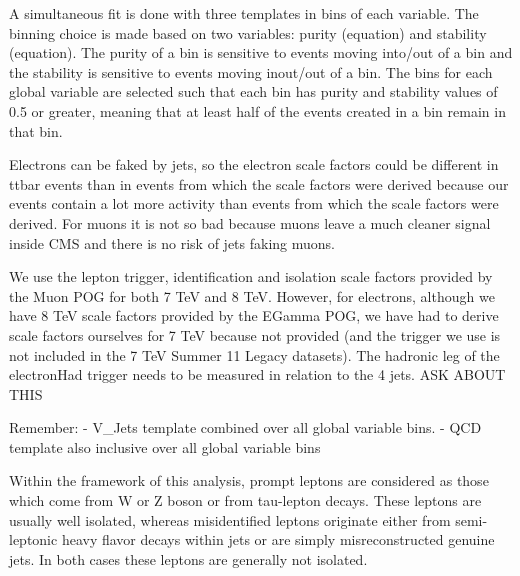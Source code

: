 A simultaneous fit is done with three templates in bins of each variable.
The binning choice is made based on two variables: purity (equation) and stability (equation). The purity of a
bin is sensitive to events moving into/out of a bin and the stability is sensitive to events moving inout/out
of a bin. The bins for each global variable are selected such that each bin has purity and stability values of
0.5 or greater, meaning that at least half of the events created in a bin remain in that bin.
	
Electrons can be faked by jets, so the electron scale factors could be different in ttbar events than in
events from which the scale factors were derived because our events contain a lot more activity than events
from which the scale factors were derived.
For muons it is not so bad because muons leave a much cleaner signal inside CMS and there is no risk of jets
faking muons.
	
We use the lepton trigger, identification and isolation scale factors provided by the Muon POG for both 7 TeV
and 8 TeV. However, for electrons, although we have 8 TeV scale factors provided by the EGamma POG, we have
had to derive scale factors ourselves for 7 TeV because not provided (and the trigger we use is not included
in the 7 TeV Summer 11 Legacy datasets).
The hadronic leg of the electronHad trigger needs to be measured in relation to the 4 jets. ASK ABOUT THIS
	 
Remember:
- V\_Jets template combined over all global variable bins.
- QCD template also inclusive over all global variable bins
	
	
	
Within the framework of this analysis, prompt leptons are considered as those which come
from W or Z boson or from tau-lepton decays. These leptons are usually well isolated, whereas
misidentified leptons originate either from semi-leptonic heavy flavor decays within jets or are
simply misreconstructed genuine jets. In both cases these leptons are generally not isolated.



